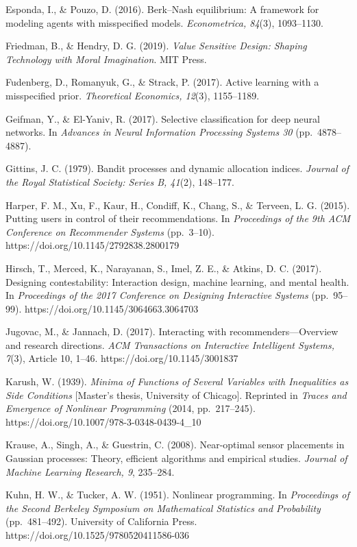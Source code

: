 \documentclass[
  11pt]{article}
\begin{document}
Esponda, I., \& Pouzo, D. (2016). Berk--Nash equilibrium: A framework
for modeling agents with misspecified models. \emph{Econometrica,
84}(3), 1093--1130.

Friedman, B., \& Hendry, D. G. (2019). \emph{Value Sensitive Design:
Shaping Technology with Moral Imagination}. MIT Press.

Fudenberg, D., Romanyuk, G., \& Strack, P. (2017). Active learning with
a misspecified prior. \emph{Theoretical Economics, 12}(3), 1155--1189.

Geifman, Y., \& El-Yaniv, R. (2017). Selective classification for deep
neural networks. In \emph{Advances in Neural Information Processing
Systems 30} (pp.~4878--4887).

Gittins, J. C. (1979). Bandit processes and dynamic allocation indices.
\emph{Journal of the Royal Statistical Society: Series B, 41}(2),
148--177.

Harper, F. M., Xu, F., Kaur, H., Condiff, K., Chang, S., \& Terveen, L.
G. (2015). Putting users in control of their recommendations. In
\emph{Proceedings of the 9th ACM Conference on Recommender Systems}
(pp.~3--10). https://doi.org/10.1145/2792838.2800179

Hirsch, T., Merced, K., Narayanan, S., Imel, Z. E., \& Atkins, D. C.
(2017). Designing contestability: Interaction design, machine learning,
and mental health. In \emph{Proceedings of the 2017 Conference on
Designing Interactive Systems} (pp.~95--99).
https://doi.org/10.1145/3064663.3064703

Jugovac, M., \& Jannach, D. (2017). Interacting with
recommenders---Overview and research directions. \emph{ACM Transactions
on Interactive Intelligent Systems, 7}(3), Article 10, 1--46.
https://doi.org/10.1145/3001837

Karush, W. (1939). \emph{Minima of Functions of Several Variables with
Inequalities as Side Conditions} {[}Master's thesis, University of
Chicago{]}. Reprinted in \emph{Traces and Emergence of Nonlinear
Programming} (2014, pp.~217--245).
https://doi.org/10.1007/978-3-0348-0439-4\_10

Krause, A., Singh, A., \& Guestrin, C. (2008). Near-optimal sensor
placements in Gaussian processes: Theory, efficient algorithms and
empirical studies. \emph{Journal of Machine Learning Research, 9},
235--284.

Kuhn, H. W., \& Tucker, A. W. (1951). Nonlinear programming. In
\emph{Proceedings of the Second Berkeley Symposium on Mathematical
Statistics and Probability} (pp.~481--492). University of California
Press. https://doi.org/10.1525/9780520411586-036
\end{document}
